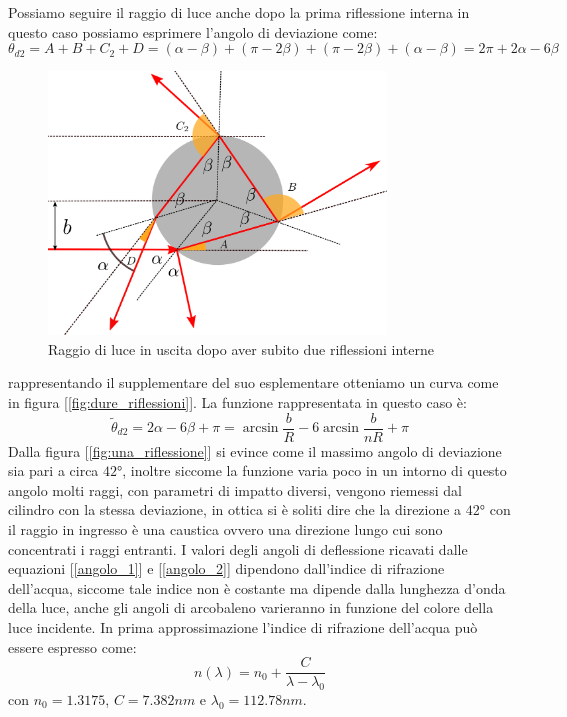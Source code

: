 \documentclass[a4paper,10pt,oneside]{article}
\begin{document}
Possiamo seguire il raggio di luce anche dopo la prima riflessione interna in questo caso possiamo esprimere l'angolo di deviazione come:
\begin{equation}\label{angolo_2}
 \theta_{d2}=A+B+C_2+D=(\alpha-\beta)+(\pi-2\beta)+(\pi-2\beta)+(\alpha-\beta)=2\pi+2\alpha-6\beta
\end{equation}
\begin{figure}[H]
 \centering
 \includegraphics[width=0.8\textwidth]{./Immagini/b_negativo.png}
 \caption{Raggio di luce in uscita dopo aver subito due riflessioni interne}
 \label{fig:b_negativo}
\end{figure}
rappresentando il supplementare del suo esplementare otteniamo un curva come in figura [\ref{fig:dure_riflessioni}]. La funzione rappresentata in questo caso è:
\begin{equation}
\tilde{\theta}_{d2}=2\alpha-6\beta+\pi=\arcsin\frac{b}{R}-6\arcsin\frac{b}{nR}+\pi
\end{equation}
Dalla figura [\ref{fig:una_riflessione}] si evince come il massimo angolo di deviazione sia pari a circa $42°$, inoltre siccome la funzione varia poco in un intorno di questo angolo molti raggi, con parametri di impatto diversi, vengono riemessi dal cilindro con la stessa deviazione, in ottica si è soliti dire che la direzione a $42°$  con il raggio in ingresso è una caustica ovvero una direzione lungo cui sono concentrati i raggi entranti.
I valori degli angoli di deflessione ricavati dalle equazioni [\ref{angolo_1}] e [\ref{angolo_2}] dipendono dall'indice di rifrazione dell'acqua, siccome tale indice non è costante ma dipende dalla lunghezza d'onda della luce, anche gli angoli di arcobaleno varieranno in funzione del colore della luce incidente. In prima approssimazione l'indice di rifrazione dell'acqua può essere espresso come:
\begin{equation}
 n(\lambda)=n_0+\frac{C}{\lambda-\lambda_0}
\end{equation}                                            
con $n_0=1.3175$, $C=7.382 nm$ e $\lambda_0=112.78 nm$.
\end{document}
